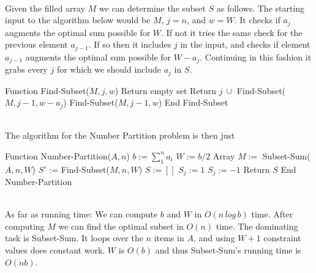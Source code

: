 \documentclass[11pt]{article}
\begin{document}
\\
Given the filled array $M$ we can determine the subset $S$ as follows. The starting input to the algorithm below would be $M$, $j=n$, and $w = W$. It checks if $a_j$ augments the optimal sum possible for $W$. If not it tries the same check for the previous element $a_{j-1}$. If so then it includes $j$ in the input, and checks if element $a_{j-1}$ augments the optimal sum possible for $W - a_j$. Continuing in this fashion it grabs every $j$ for which we should include $a_j$ in $S$.\\
\begin{algorithmic}
\STATE Function Find-Subset($M, j, w$)
\STATE Return empty set
\STATE Return $j\ \cup $ Find-Subset($M,j-1,w-a_j$)
\ELSE
\STATE  Find-Subset($M,j-1,w$)
\ENDIF
\STATE End Find-Subset
\end{algorithmic}
\leavevmode
\\
The algorithm for the Number Partition problem is then just
\begin{algorithmic}
\STATE Function Number-Partition($A, n$)
\STATE $b := \sum_1^n a_i$
\STATE $W := b/2$
\STATE Array $M := $ Subset-Sum($A, n, W$)
\STATE $S'$ := Find-Subset($M,n,W$)
\STATE $S := []$ 
\STATE $S_j := 1$
\ELSE
\STATE $S_j := -1$
\ENDIF
\ENDFOR
\STATE Return $S$
\STATE End Number-Partition
\end{algorithmic}
\leavevmode
\\
As far as running time: We can compute $b$ and $W$ in $O(n\,log \,b)$ time. After computing $M$ we can find the optimal subset in $O(n)$ time. The dominating task is Subset-Sum. It loops over the $n$ items in $A$, and using $W+1$ constraint values does constant work. $W$ is $O(b)$ and thus Subset-Sum's running time is $O(nb)$. 
\end{document}
